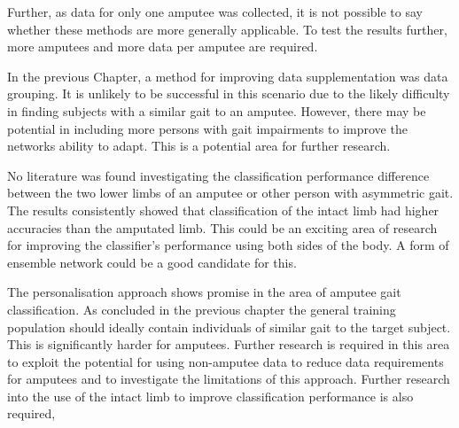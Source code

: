 Further, as data for only one amputee was collected, it is not possible to say whether these methods are more generally applicable. To test the results further, more amputees and more data per amputee are required.

In the previous Chapter, a method for improving data supplementation was data grouping. It is unlikely to be successful in this scenario due to the likely difficulty in finding subjects with a similar gait to an amputee. However, there may be potential in including more persons with gait impairments to improve the networks ability to adapt. This is a potential area for further research.

No literature was found investigating the classification performance difference between the two lower limbs of an amputee or other person with asymmetric gait. The results consistently showed that classification of the intact limb had higher accuracies than the amputated limb. This could be an exciting area of research for improving the classifier's performance using both sides of the body. A form of ensemble network could be a good candidate for this.

The personalisation approach shows promise in the area of amputee gait classification. As concluded in the previous chapter the general training population should ideally contain individuals of similar gait to the target subject. This is significantly harder for amputees. Further research is required in this area to exploit the potential for using non-amputee data to reduce data requirements for amputees and to investigate the limitations of this approach. Further research into the use of the intact limb to improve classification performance is also required,
